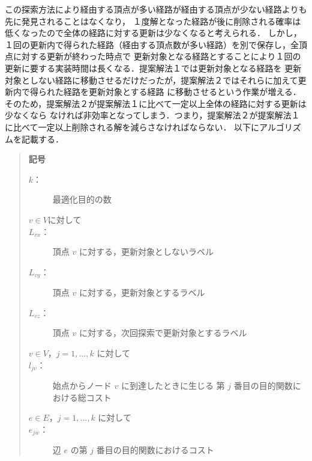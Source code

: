 \documentclass[12pt]{optlab-bachelor}
\begin{document}
この探索方法により経由する頂点が多い経路が経由する頂点が少ない経路よりも先に発見されることはなくなり，
１度解となった経路が後に削除される確率は低くなったので全体の経路に対する更新は少なくなると考えられる．
しかし，１回の更新内で得られた経路（経由する頂点数が多い経路）を別で保存し，全頂点に対する更新が終わった時点で
更新対象となる経路とすることにより１回の更新に要する実装時間は長くなる．提案解法１では更新対象となる経路を
更新対象としない経路に移動させるだけだったが，提案解法２ではそれらに加えて更新内で得られた経路を更新対象とする経路
に移動させるという作業が増える．そのため，提案解法２が提案解法１に比べて一定以上全体の経路に対する更新は少なくなら
なければ非効率となってしまう．つまり，提案解法２が提案解法１に比べて一定以上削除される解を減らさなければならない．
以下にアルゴリズムを記載する．

\begin{quote}
  \textbf{記号}
  \begin{description}
    \item[$k$：] 最適化目的の数
    \item[$v \in V$に対して]
    \item[$L_{vx}$：] 頂点 $v$ に対する，更新対象としないラベル
    \item[$L_{vy}$：] 頂点 $v$ に対する，更新対象とするラベル
    \item[$L_{vz}$：] 頂点 $v$ に対する，次回探索で更新対象とするラベル
    \item[$v \in V$，$j = 1 , \ldots , k$ に対して]
    \item[$l_{jv}$：] 始点からノード $v$ に到達したときに生じる
    第 $j$ 番目の目的関数における総コスト
    \item[$e \in E$，$j = 1 , \ldots , k$ に対して]
    \item[$e_{jw}$：] 辺 $e$ の第 $j$ 番目の目的関数におけるコスト
  \end{description}
\end{quote}
\end{document}
